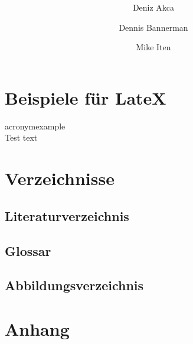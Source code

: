 \documentclass[a4paper]{article}
\author{
	Deniz Akca
	\and
	Dennis Bannerman
	\and
	Mike Iten
}
\affil{ZHAW - Zurich}
\title{
	\Huge{}\color{blue}\textbf{\project}\\ 
	\vspace{2cm}
	\large{}\color{black}\textbf{\outline}
}
\begin{document}
	\sloppy
	
	\begin{titlepage}
		\maketitle
		\thispagestyle{empty}
	\end{titlepage}
	
	\tableofcontents
	\newpage
	
	\fussy
	
	
	
	
	
	
	
	
	
	

	\section{Beispiele für LateX}
	\gls{acronymexample} \\
	\cite{Bibtex2021} Test text

	\section{Verzeichnisse}
	\subsection{Literaturverzeichnis}
	\subsection{Glossar}
	\subsection{Abbildungsverzeichnis}
	
	
	\section{Anhang}
		
	\newpage

	\printglossary[type=\acronymtype]
	\printglossary
	
	\newpage
	\printbibliography[heading=bibintoc]
	
	\newpage
		
\end{document}
